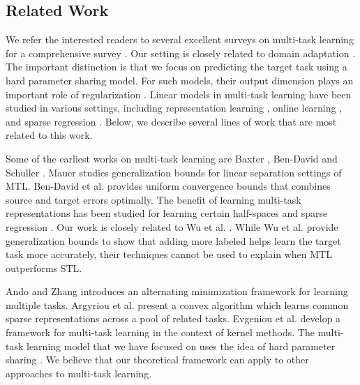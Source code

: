 

\subsection{Related Work}

We refer the interested readers to several excellent surveys on multi-task  learning for a comprehensive survey \cite{PY09,R17,ZY17,V20}.
Our setting is closely related to domain adaptation \cite{DM06,BB07,BC08,DH09,MMR09,CWB11,ZS13,NB17,ZD19}.
The important distinction is that we focus on predicting the target task using a hard parameter sharing model.
For such models, their output dimension plays an important role of regularization \cite{KD12}.
Linear models in multi-task learning have been studied in various settings, including representation learning \cite{BHKL19}, online learning \cite{CCG10,DCSP18}, and sparse regression \cite{LPVT11}.
Below, we describe several lines of work that are most related to this work.

Some of the earliest works on multi-task learning are Baxter \cite{B00}, Ben-David and Schuller \cite{BS03}.
Mauer \cite{M06} studies generalization bounds for linear separation settings of MTL.
Ben-David et al. \cite{BBCK10} provides uniform convergence bounds that combines source and target errors optimally.
The benefit of learning multi-task representations has been studied for learning certain half-spaces \cite{MPR16} and sparse regression \cite{LPTV09,LPVT11}.
Our work is closely related to Wu et al. \cite{WZR20}.
While Wu et al. provide generalization bounds to show that adding more labeled helps learn the target task more accurately, their techniques cannot be used to explain when MTL outperforms STL.

Ando and Zhang \cite{AZ05} introduces an alternating minimization framework for learning multiple tasks.
Argyriou et al. \cite{AEP08} present a convex algorithm which learns common sparse representations across a pool of related tasks.
Evgeniou et al. \cite{EMP05} develop a framework for multi-task learning in the context of kernel methods.
The multi-task learning model that we have focused on uses the idea of hard parameter sharing \cite{C93,KD12,R17}.
We believe that our theoretical framework can apply to other approaches to multi-task learning.

